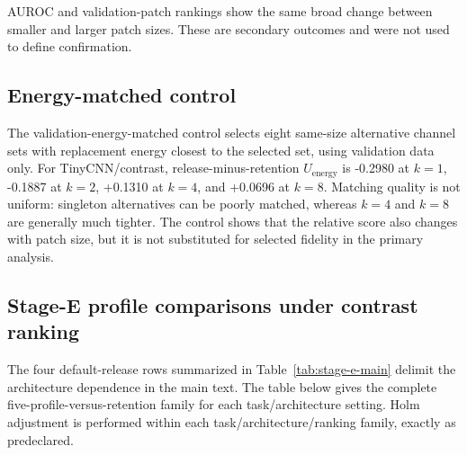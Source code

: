 AUROC and validation-patch rankings show the same broad change between smaller and larger patch sizes. These are secondary outcomes and were not used to define confirmation.

\subsection{Energy-matched control}\label{app:energy-control}

The validation-energy-matched control selects eight same-size alternative channel sets with replacement energy closest to the selected set, using validation data only. For TinyCNN/contrast, release-minus-retention $U_{\mathrm{energy}}$ is -0.2980 at $k=1$, -0.1887 at $k=2$, +0.1310 at $k=4$, and +0.0696 at $k=8$. Matching quality is not uniform: singleton alternatives can be poorly matched, whereas $k=4$ and $k=8$ are generally much tighter. The control shows that the relative score also changes with patch size, but it is not substituted for selected fidelity in the primary analysis.

\subsection{Stage-E profile comparisons under contrast ranking}\label{app:stage-e-profiles}

The four default-release rows summarized in Table~\ref{tab:stage-e-main} delimit the architecture dependence in the main text. The table below gives the complete five-profile-versus-retention family for each task/architecture setting. Holm adjustment is performed within each task/architecture/ranking family, exactly as predeclared.

